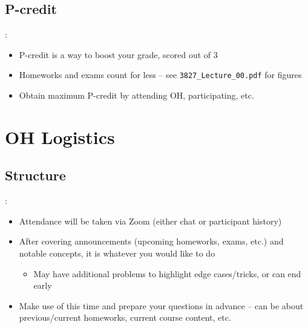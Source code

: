 \documentclass{../slides}
\begin{document}
\subsection{P-credit}
\begin{frame}{\secname: \subsecname}
    \begin{itemize}
        \item P-credit is a way to boost your grade, scored out of $3$
        \item Homeworks and exams count for less -- see \lstinline{3827_Lecture_00.pdf} for figures
        \item Obtain maximum P-credit by attending OH, participating, etc.
    \end{itemize}
\end{frame}

\section{OH Logistics}
\subsection{Structure}
\begin{frame}{\secname: \subsecname}
    \begin{itemize}
        \item Attendance will be taken via Zoom (either chat or participant history)
        \item After covering announcements (upcoming homeworks, exams, etc.) and notable concepts, it is whatever you would like to do
        \begin{itemize}
            \item May have additional problems to highlight edge cases/tricks, or can end early
        \end{itemize}
        \item Make use of this time and prepare your questions in advance -- can be about previous/current homeworks, current course content, etc.
    \end{itemize}
\end{frame}
\end{document}
